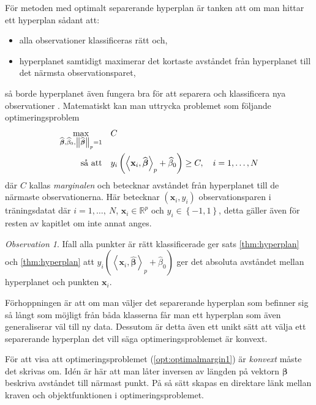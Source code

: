 \documentclass[a4paper, 12pt]{report}
\theoremstyle{definition}
\theoremstyle{remark}
\newtheorem*{rem}{Observation}
\newcommand{\bfbeta}{{\boldsymbol{\beta}}}
\newcommand{\bfx}{\mathbf{x}}
\newcommand{\llangle}{\left\langle}
\newcommand{\rrangle}{\right\rangle}
\newcommand{\inner}[2]{\llangle #1, #2 \rrangle}
\begin{document}
För metoden med optimalt separerande hyperplan är tanken att om man hittar ett hyperplan sådant att:
\begin{itemize}
	\item alla observationer klassificeras rätt och,
	\item hyperplanet samtidigt maximerar det kortaste avståndet från hyperplanet till det närmsta observationsparet,
\end{itemize}
så borde hyperplanet även fungera bra för att separera och klassificera nya observationer \cite{VapnikLerner1963}.
Matematiskt kan man uttrycka problemet som följande optimeringsproblem
\begin{equation}\label{opt:optimalmargin1}
\begin{aligned}
	 \operatornamewithlimits{max}_{\widehat{\bfbeta},\widehat{\beta}_0,\left\|\widehat{\bfbeta}\right\|_p=1}& & &C\\
	 \text{så att}& & &y_i\left(\inner{\bfx_i}{\widehat{\bfbeta}}_p+\widehat{\beta}_0\right)\geq C,\quad i=1,\dots,N
\end{aligned}
\end{equation}
där $C$ kallas \emph{marginalen} och betecknar avståndet från hyperplanet till de närmaste observationerna. Här betecknar $\left(\bfx_i, y_i\right)$ observationsparen i träningsdatat där $i=1,\dots,~N$, $\bfx_i\in\mathbb{R}^p$ och $y_i\in\left\{-1,1 \right\}$, detta gäller även för resten av kapitlet om inte annat anges.
\begin{rem}
	Ifall alla punkter är rätt klassificerade ger sats \ref{thm:hyperplan} och \ref{thm:hyperplan} att $y_i\left(\inner{\bfx_i}{\widehat{\bfbeta}}_p+\widehat{\beta}_0\right)$ ger det absoluta avståndet mellan hyperplanet och punkten $\mathbf{x}_i$.
\end{rem}

Förhoppningen är att om man väljer det separerande hyperplan som befinner sig så långt som möjligt från båda klasserna får man ett hyperplan som även generaliserar väl till ny data. Dessutom är detta även ett unikt sätt att välja ett separerande hyperplan det vill säga optimeringsproblemet är konvext. %

För att visa att optimeringsproblemet (\ref{opt:optimalmargin1}) är \textit{konvext} måste det skrivas om. Idén är här att man låter inversen av längden på vektorn $\bfbeta$ beskriva avståndet till närmast punkt. På så sätt skapas en direktare länk mellan kraven och objektfunktionen i optimeringsproblemet.
\end{document}
